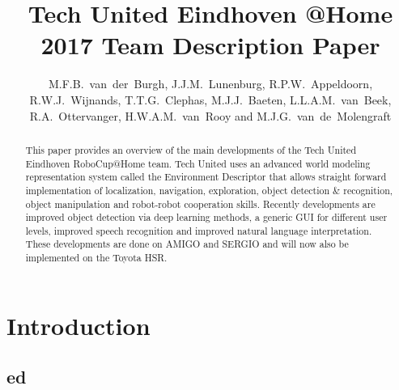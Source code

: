 \documentclass[runningheads,a4paper]{llncs}
\begin{document}
\title{Tech United Eindhoven @Home \\2017 Team Description Paper}
\author{M.F.B.~van~der~Burgh, J.J.M.~Lunenburg, R.P.W.~Appeldoorn, R.W.J.~Wijnands, T.T.G.~Clephas, M.J.J.~Baeten, L.L.A.M.~van~Beek, R.A.~Ottervanger, H.W.A.M.~van~Rooy and M.J.G.~van~de~Molengraft}

\maketitle



\begin{abstract}
This paper provides an overview of the main developments of the Tech United Eindhoven RoboCup@Home team. Tech United uses an advanced world modeling representation system called the Environment Descriptor that allows straight forward implementation of localization, navigation, exploration, object detection \& recognition, object manipulation and robot-robot cooperation skills. Recently developments are improved object detection via deep learning methods, a generic GUI for different user levels, improved speech recognition and improved natural language interpretation. These developments are done on AMIGO and SERGIO and will now also be implemented on the Toyota HSR.
\end{abstract}


\section{Introduction}


\subsection{\acrfull{ed}}

\end{document}
